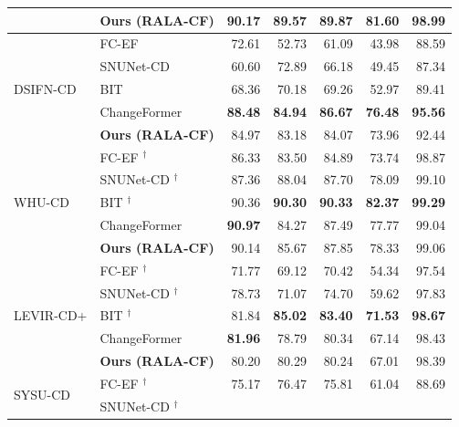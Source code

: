 \documentclass[runningheads]{llncs}
\begin{document}
\begin{table}
\begin{tabularx}{\textwidth}{|l|X|r|r|r|r|r|}
    & \textbf{Ours (RALA-CF)}
        & 90.17 & \textbf{89.57} & 89.87 & 81.60 & 98.99 \\
\hline
\multirow{5}{*}{DSIFN-CD}
    & FC-EF \cite{Daudt2018SiamICIP}
        & 72.61 & 52.73 & 61.09 & 43.98 & 88.59 \\
    & SNUNet-CD \cite{Fang2021SNUNetCD}
        & 60.60 & 72.89 & 66.18 & 49.45 & 87.34 \\
    & BIT \cite{Chen2022BIT}
        & 68.36 & 70.18 & 69.26 & 52.97 & 89.41 \\
    & ChangeFormer \cite{Bandara2022ChangeFormer}
        & \textbf{88.48} & \textbf{84.94} & \textbf{86.67} & \textbf{76.48} & \textbf{95.56} \\
\rowcolor{pastelorange}
    & \textbf{Ours (RALA-CF)}
        & 84.97 & 83.18 & 84.07 & 73.96 & 92.44 \\
\hline
\multirow{5}{*}{WHU-CD}
    & FC-EF \cite{Daudt2018SiamICIP}$^\dagger$
        & 86.33 & 83.50 & 84.89 & 73.74 & 98.87 \\
    & SNUNet-CD \cite{Fang2021SNUNetCD}$^\dagger$
        & 87.36 & 88.04 & 87.70 & 78.09 & 99.10 \\
    & BIT \cite{Chen2022BIT}$^\dagger$
        & 90.36 & \textbf{90.30} & \textbf{90.33} & \textbf{82.37} & \textbf{99.29} \\
    & ChangeFormer \cite{Bandara2022ChangeFormer}
        & \textbf{90.97} & 84.27 & 87.49 & 77.77 & 99.04 \\
\rowcolor{pastelorange}
    & \textbf{Ours (RALA-CF)}
        & 90.14 & 85.67 & 87.85 & 78.33 & 99.06 \\
\hline
\multirow{5}{*}{LEVIR-CD+}
    & FC-EF \cite{Daudt2018SiamICIP}$^\dagger$
        & 71.77 & 69.12 & 70.42 & 54.34 & 97.54 \\
    & SNUNet-CD \cite{Fang2021SNUNetCD}$^\dagger$
        & 78.73 & 71.07 & 74.70 & 59.62 & 97.83 \\
    & BIT \cite{Chen2022BIT}$^\dagger$
        & 81.84 & \textbf{85.02} & \textbf{83.40} & \textbf{71.53} & \textbf{98.67} \\
    & ChangeFormer \cite{Bandara2022ChangeFormer}
        & \textbf{81.96} & 78.79 & 80.34 & 67.14 & 98.43 \\
\rowcolor{pastelorange}
    & \textbf{Ours (RALA-CF)}
        & 80.20 & 80.29 & 80.24 & 67.01 & 98.39 \\
\hline
\multirow{5}{*}{SYSU-CD}
    & FC-EF \cite{Daudt2018SiamICIP}$^\dagger$
        & 75.17 & 76.47 & 75.81 & 61.04 & 88.69 \\
    & SNUNet-CD \cite{Fang2021SNUNetCD}$^\dagger$

\end{tabularx}
\end{table}
\end{document}
